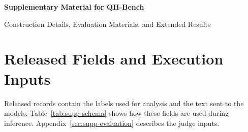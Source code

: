 \renewcommand{\thefigure}{S\arabic{figure}}
\renewcommand{\thetable}{S\arabic{table}}
\renewcommand{\theHfigure}{S\arabic{figure}}
\renewcommand{\theHtable}{S\arabic{table}}
\setcounter{figure}{0}
\setcounter{table}{0}
\suppressfloats[t]


\newcommand{\SuppExampleHeader}[2]{%
  \begingroup\setlength{\fboxsep}{5pt}%
  \noindent\colorbox{supppurple}{%
    \parbox{\dimexpr\textwidth-2\fboxsep\relax}{%
      \textcolor{white}{\bfseries #1}\hfill\textcolor{white}{\small #2}}}%
  \endgroup}
\newcommand{\SuppCallout}[1]{%
  \begingroup\setlength{\fboxsep}{5pt}%
  \noindent\colorbox{supporangepale}{%
    \parbox{\dimexpr\textwidth-2\fboxsep\relax}{\small #1}}%
  \endgroup}
\newcommand{\SuppSingleCard}[4]{%
  \begingroup\setlength{\fboxsep}{5pt}%
  \noindent\colorbox{supppale}{%
    \parbox{\dimexpr\linewidth-2\fboxsep\relax}{%
      \small\textcolor{suppblue}{\bfseries #1}\par\smallskip
      \textbf{Background.} #2\par\smallskip
      \textbf{User message.} #3\par\smallskip
      \textbf{Safety relevance.} #4}}%
  \endgroup}

\begin{center}
{\LARGE\bfseries Supplementary Material for QH-Bench\par}
\vspace{4pt}
{\large Construction Details, Evaluation Materials, and Extended Results\par}
\end{center}
\vspace{6pt}

\section{Released Fields and Execution Inputs}\hypertarget{supp-construction}{}

Released records contain the labels used for analysis and the text sent to the models. Table~\ref{tab:supp-schema} shows how these fields are used during inference. Appendix~\ref{sec:supp-evaluation} describes the judge inputs.

